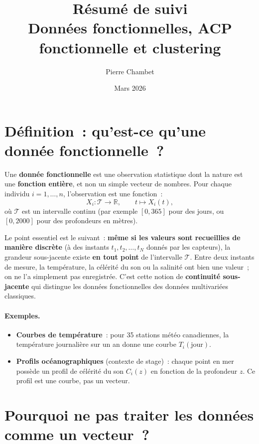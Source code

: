 \documentclass[11pt, a4paper]{article}
\title{\textbf{R\'esum\'e de suivi} \\ \large Donn\'ees fonctionnelles, ACP fonctionnelle et clustering}
\author{Pierre Chambet}
\date{Mars 2026}
\newcommand{\R}{\mathbb{R}}
\begin{document}
\maketitle
\tableofcontents
\newpage

\section{D\'efinition~: qu'est-ce qu'une donn\'ee fonctionnelle~?}

Une \textbf{donn\'ee fonctionnelle} est une observation statistique dont la nature est une \textbf{fonction enti\`ere}, et non un simple vecteur de nombres. Pour chaque individu $i = 1, \ldots, n$, l'observation est une fonction~:
\[
    X_i : \mathcal{T} \longrightarrow \R, \qquad t \longmapsto X_i(t),
\]
o\`u $\mathcal{T}$ est un intervalle continu (par exemple $[0, 365]$ pour des jours, ou $[0, 2000]$ pour des profondeurs en m\`etres).

Le point essentiel est le suivant~: \textbf{m\^eme si les valeurs sont recueillies de mani\`ere discr\`ete} (\`a des instants $t_1, t_2, \ldots, t_N$ donn\'es par les capteurs), la grandeur sous-jacente existe \textbf{en tout point} de l'intervalle $\mathcal{T}$. Entre deux instants de mesure, la temp\'erature, la c\'el\'erit\'e du son ou la salinit\'e ont bien une valeur~; on ne l'a simplement pas enregistr\'ee. C'est cette notion de \textbf{continuit\'e sous-jacente} qui distingue les donn\'ees fonctionnelles des donn\'ees multivari\'ees classiques.

\paragraph{Exemples.}
\begin{itemize}[nosep]
    \item \textbf{Courbes de temp\'erature}~: pour 35 stations m\'et\'eo canadiennes, la temp\'erature journali\`ere sur un an donne une courbe $T_i(\text{jour})$.
    \item \textbf{Profils oc\'eanographiques} (contexte de stage)~: chaque point en mer poss\`ede un profil de c\'el\'erit\'e du son $C_i(z)$ en fonction de la profondeur $z$. Ce profil est une courbe, pas un vecteur.
\end{itemize}

\section{Pourquoi ne pas traiter les donn\'ees comme un vecteur~?}
\end{document}
